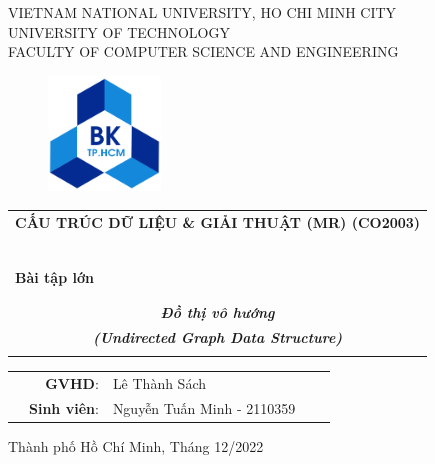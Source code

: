 \documentclass[a4paper]{article}
\begin{document}
\begin{titlepage}
\begin{center}
VIETNAM NATIONAL UNIVERSITY, HO CHI MINH CITY \\
UNIVERSITY OF TECHNOLOGY \\
FACULTY OF COMPUTER SCIENCE AND ENGINEERING
\end{center}

\vspace{1cm}

\begin{figure}[h!]
\begin{center}
\includegraphics[width=3cm]{hcmut.png}
\end{center}
\end{figure}

\vspace{1cm}


\begin{center}
\begin{tabular}{c}
\multicolumn{1}{l}{\textbf{{\Large CẤU TRÚC DỮ LIỆU \& GIẢI THUẬT (MR) (CO2003)}}}\\
~~\\
\hline
\\
\multicolumn{1}{l}{\textbf{{\Large Bài tập lớn}}}\\
\\
\\
\textbf{\textit{\Huge Đồ thị vô 
hướng }}\\
\textbf{\textit{\Huge (Undirected Graph Data Structure)}}
\\
\\
\hline
\end{tabular}
\end{center}


\begin{table}[h]
\begin{tabular}{rrlrr}
\hspace{4 cm} & \textbf{\Large GVHD}: &\Large Lê Thành Sách&\\
& \textbf{\Large Sinh viên}: & \Large Nguyễn Tuấn Minh  - 2110359 
\end{tabular}
\end{table}
\vspace{4cm}
\begin{center}
{\footnotesize Thành phố Hồ Chí Minh, Tháng 12/2022}
\end{center}
\end{titlepage}
\end{document}
